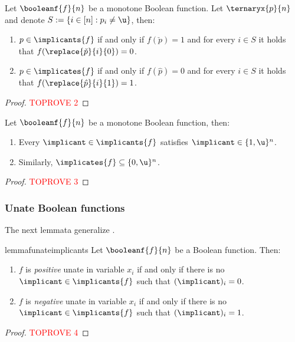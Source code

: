 \documentclass[acmsmall, nonacm, authorversion]{acmart}
\begin{document}
\begin{lemma}\label{lem:prime-implicants-implicates-monotone}
Let $\booleanf{f}{n}$ be a monotone Boolean function. Let $\ternaryx{p}{n}$ and denote $S:=\{i\in [n]: p_i\neq \u\}$, then:
\begin{enumerate}
    \item $p \in \implicants{f}$ if and only if $f(\check{p})=1$ and for every $i\in S$ it holds that $f(\replace{\check{p}}{i}{0})=0$.\label{item:prime-implicants-implicates-monotone-1}
    \item $p \in \implicates{f}$ if and only if $f(\hat{p})=0$ and for every $i\in S$ it holds that $f(\replace{\hat{p}}{i}{1})=1$.\label{item:prime-implicants-implicates-monotone-2}
\end{enumerate}
\end{lemma}
\begin{proof}\textcolor{red}{TOPROVE 2}\end{proof}

\begin{corollary}\label{cor:prime-monotone}
Let $\booleanf{f}{n}$ be a monotone Boolean function, then:
\begin{enumerate}
    \item Every $\implicant \in \implicants{f}$ satisfies $\implicant\in\{1,\u\}^{n}$. \label{item:prime-monotone-1}
    \item Similarly, $\implicates{f} \subseteq  \{0,\u\}^{n}$. \label{item:prime-monotone-2}
\end{enumerate}
\end{corollary}
\begin{proof}\textcolor{red}{TOPROVE 3}\end{proof}

\subsubsection{Unate Boolean functions}
The next lemmata generalize . 

\begin{restatable}{lemma}{funateimplicants}\label{lem:f-unate-implicants}
Let $\booleanf{f}{n}$ be a Boolean function. Then:
\begin{enumerate}
    \item $f$ is \emph{positive} unate in variable $x_{i}$ if and only if there is no $\implicant \in \implicants{f}$ such that $(\implicant)_{i}=0$. \label{item:f-unate-implicants-1}
    \item $f$ is \emph{negative} unate in variable $x_{i}$ if and only if there is no $\implicant \in \implicants{f}$ such that $(\implicant)_{i}=1$.\label{item:f-unate-implicants-2}
\end{enumerate}    
\end{restatable}
\begin{proof}\textcolor{red}{TOPROVE 4}\end{proof}
\end{document}
